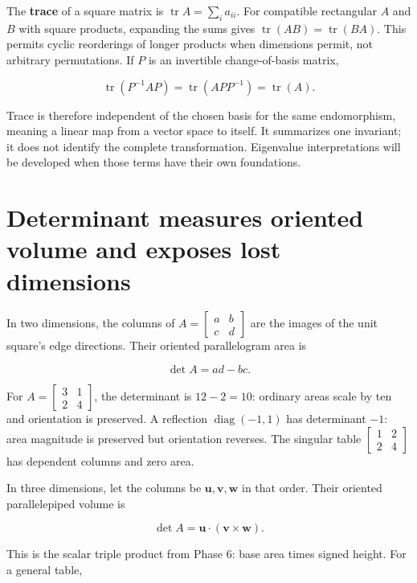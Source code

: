 The \textbf{trace} of a square matrix is \(\operatorname{tr}A=\sum_i a_{ii}\). For compatible rectangular \(A\) and \(B\) with square products, expanding the sums gives \(\operatorname{tr}(AB)=\operatorname{tr}(BA)\). This permits cyclic reorderings of longer products when dimensions permit, not arbitrary permutations. If \(P\) is an invertible change-of-basis matrix,

\[
\operatorname{tr}(P^{-1}AP)=\operatorname{tr}(APP^{-1})=\operatorname{tr}(A).
\]

Trace is therefore independent of the chosen basis for the same endomorphism, meaning a linear map from a vector space to itself. It summarizes one invariant; it does not identify the complete transformation. Eigenvalue interpretations will be developed when those terms have their own foundations.

\section{Determinant measures oriented volume and exposes lost dimensions}\label{01-foundations-i-ch018-determinant-measures-oriented-volume-and-exposes-lost-dimensions}

In two dimensions, the columns of \(A=\begin{bmatrix}a&b\\c&d\end{bmatrix}\) are the images of the unit square's edge directions. Their oriented parallelogram area is

\[
\det A=ad-bc.
\]

For \(A=\begin{bmatrix}3&1\\2&4\end{bmatrix}\), the determinant is \(12-2=10\): ordinary areas scale by ten and orientation is preserved. A reflection \(\operatorname{diag}(-1,1)\) has determinant \(-1\): area magnitude is preserved but orientation reverses. The singular table \(\begin{bmatrix}1&2\\2&4\end{bmatrix}\) has dependent columns and zero area.

In three dimensions, let the columns be \(\mathbf u,\mathbf v,\mathbf w\) in that order. Their oriented parallelepiped volume is

\[
\det A=\mathbf u\cdot(\mathbf v\times\mathbf w).
\]

This is the scalar triple product from Phase 6: base area times signed height. For a general table,

